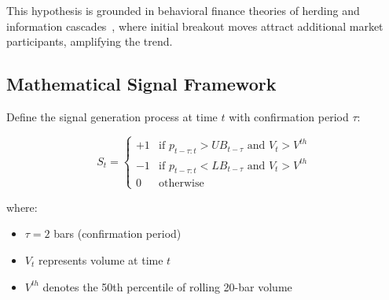 \documentclass[twocolumn,ieee]{arithmaxresearch}
\begin{document}
This hypothesis is grounded in behavioral finance theories of herding and information cascades~\cite{bikhchandani1992herd}, where initial breakout moves attract additional market participants, amplifying the trend.

\subsection{Mathematical Signal Framework}

Define the signal generation process at time $t$ with confirmation period $\tau$:

\begin{equation}
S_t = \begin{cases}
+1 & \text{if } p_{t-\tau:t} > UB_{t-\tau} \text{ and } V_t > V^{th} \\
-1 & \text{if } p_{t-\tau:t} < LB_{t-\tau} \text{ and } V_t > V^{th} \\
0 & \text{otherwise}
\end{cases}
\end{equation}

where:
\begin{itemize}
    \item $\tau = 2$ bars (confirmation period)
    \item $V_t$ represents volume at time $t$
    \item $V^{th}$ denotes the 50th percentile of rolling 20-bar volume
\end{itemize}
\end{document}
